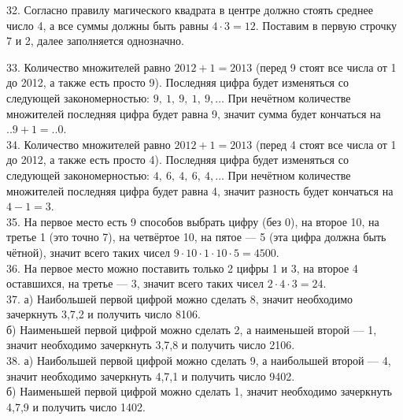 \documentclass[12pt]{article}
\begin{document}
32. Согласно правилу магического квадрата в центре должно стоять среднее число 4, а все суммы должны быть равны $4\cdot3=12.$ Поставим в первую строчку 7 и 2, далее заполняется однозначно.
\begin{center}
\begin{figure}[ht!]
\end{figure}
\end{center}
33. Количество множителей равно $2012+1=2013$ (перед 9 стоят все числа от 1 до 2012, а также есть просто 9). Последняя цифра будет изменяться со следующей закономерностью: $9,\ 1,\ 9,\ 1,\ 9,\ldots$ При нечётном количестве множителей последняя цифра будет равна 9, значит сумма будет кончаться на $..9+1=..0$.\\
34. Количество множителей равно $2012+1=2013$ (перед 4 стоят все числа от 1 до 2012, а также есть просто 4). Последняя цифра будет изменяться со следующей закономерностью: $4,\ 6,\ 4,\ 6,\ 4,\ldots$ При нечётном количестве множителей последняя цифра будет равна 4, значит разность будет кончаться на $4-1=3.$\\
35. На первое место есть 9 способов выбрать цифру (без 0), на второе 10, на третье 1 (это точно 7), на четвёртое 10, на пятое --- 5 (эта цифра должна быть чётной), значит всего таких чисел $9\cdot10\cdot1\cdot10\cdot5=4500.$\\
36. На первое место можно поставить только 2 цифры 1 и 3, на второе 4 оставшихся, на третье --- 3, значит всего таких чисел $2\cdot4\cdot3=24.$\\
37. а) Наибольшей первой цифрой можно сделать 8, значит необходимо зачеркнуть 3,7,2 и получить число 8106.\\
б) Наименьшей первой цифрой можно сделать 2, а наименьшей второй --- 1, значит необходимо зачеркнуть 3,7,8 и получить число 2106.\\
38. а) Наибольшей первой цифрой можно сделать 9, а наибольшей второй --- 4, значит необходимо зачеркнуть 4,7,1 и получить число 9402.\\
б) Наименьшей первой цифрой можно сделать 1, значит необходимо зачеркнуть 4,7,9 и получить число 1402.\\
\end{document}
